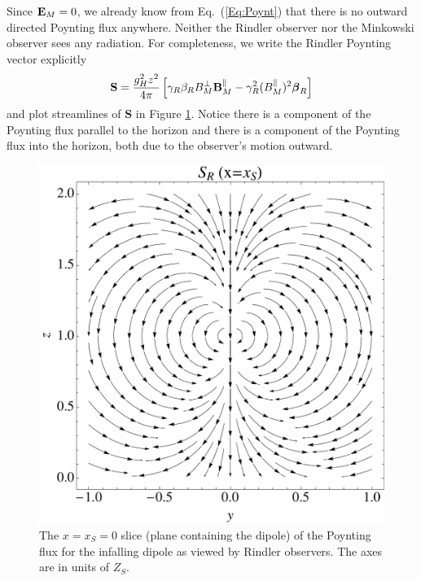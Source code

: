 Since ${\bf E}_M=0$, we already know from Eq.\ (\ref{Eq:Poynt}) that there is no outward
directed Poynting flux anywhere. Neither the Rindler observer nor the Minkowski
observer sees any radiation. For completeness,
we write the Rindler Poynting vector explicitly
\begin{align}
\mathbf{S} = \frac{g_H^2 z^2}{4 \pi}   \left[\gamma_R \beta_R B_M^{\perp} {\bf B}_M^{\parallel} -\gamma_R^2 (B_M^{\parallel})^2 {\boldsymbol \beta}_R \right ]
\label{RPoynt_InfD}
\end{align}
and plot streamlines of $\mathbf{S}$ in Figure \ref{SInf}. 
Notice there is a component of the Poynting flux parallel to the
horizon and there is a component of
the Poynting flux into the horizon, both due to the observer's motion
outward.  


\begin{figure}
\begin{center}
\includegraphics[scale=0.45]{figures/ch6/FmunuINF_t01_x0_Syz.pdf} 
\end{center}
\caption{The $x=x_S=0$ slice (plane containing the dipole) of the Poynting flux for the infalling dipole
 as viewed by Rindler observers. The axes are in units of $Z_S$. }
\label{SInf}
\end{figure}


